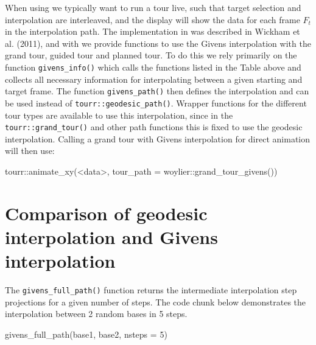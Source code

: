 \documentclass{article}
\newenvironment{Shaded}{\begin{snugshade}}{\end{snugshade}}
\newcommand{\AttributeTok}[1]{\textcolor[rgb]{0.77,0.63,0.00}{#1}}
\newcommand{\DecValTok}[1]{\textcolor[rgb]{0.00,0.00,0.81}{#1}}
\newcommand{\FunctionTok}[1]{\textcolor[rgb]{0.00,0.00,0.00}{#1}}
\newcommand{\NormalTok}[1]{#1}
\newcommand{\SpecialCharTok}[1]{\textcolor[rgb]{0.00,0.00,0.00}{#1}}
\begin{document}
When using  we typically want to run a tour live, such
that target selection and interpolation are interleaved, and the display
will show the data for each frame \(F_t\) in the interpolation path. The
implementation in  was described in Wickham et al.
(2011), and with  we provide functions to use the
Givens interpolation with the grand tour, guided tour and planned tour.
To do this we rely primarily on the function \texttt{givens\_info()}
which calls the functions listed in the Table above and collects all
necessary information for interpolating between a given starting and
target frame. The function \texttt{givens\_path()} then defines the
interpolation and can be used instead of
\texttt{tourr::geodesic\_path()}. Wrapper functions for the different
tour types are available to use this interpolation, since in the
\texttt{tourr::grand\_tour()} and other path functions this is fixed to
use the geodesic interpolation. Calling a grand tour with Givens
interpolation for direct animation will then use:

\begin{Shaded}
\begin{Highlighting}[]
\NormalTok{tourr}\SpecialCharTok{::}\FunctionTok{animate\_xy}\NormalTok{(}\SpecialCharTok{\textless{}}\NormalTok{data}\SpecialCharTok{\textgreater{}}\NormalTok{, }\AttributeTok{tour\_path =}\NormalTok{ woylier}\SpecialCharTok{::}\FunctionTok{grand\_tour\_givens}\NormalTok{())}
\end{Highlighting}
\end{Shaded}

\hypertarget{comparison-of-geodesic-interpolation-and-givens-interpolation}{%
\section{Comparison of geodesic interpolation and Givens
interpolation}\label{comparison-of-geodesic-interpolation-and-givens-interpolation}}

The \texttt{givens\_full\_path()} function returns the intermediate
interpolation step projections for a given number of steps. The code
chunk below demonstrates the interpolation between 2 random bases in 5
steps.

\begin{Shaded}
\begin{Highlighting}[]
\FunctionTok{givens\_full\_path}\NormalTok{(base1, base2, }\AttributeTok{nsteps =} \DecValTok{5}\NormalTok{)}
\end{Highlighting}
\end{Shaded}
\end{document}

